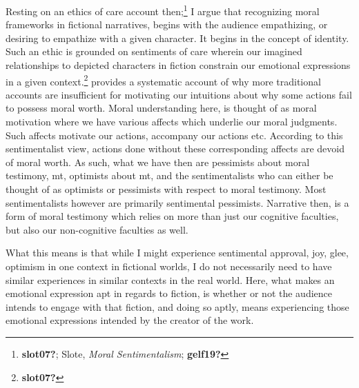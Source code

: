 \documentclass[phdthesis,12pt,final]{wuthesis}
\theoremstyle{definition}
\theoremstyle{definition}
\theoremstyle{definition}
\theoremstyle{definition}
\theoremstyle{remark}
\begin{document}
Resting on an ethics of care account then;\footnote{\textbf{slot07?}; Slote, \emph{Moral {Sentimentalism}}; \textbf{gelf19?}} I argue that recognizing moral frameworks in fictional narratives, begins with the audience empathizing, or desiring to empathize with a given character. It begins in the concept of identity. Such an ethic is grounded on sentiments of care wherein our imagined relationships to depicted characters in fiction constrain our emotional expressions in a given context.\footnote{\textbf{slot07?}} provides a systematic account of why more traditional accounts are insufficient for motivating our intuitions about why some actions fail to possess moral worth. Moral understanding here, is thought of as moral motivation where we have various affects which underlie our moral judgments. Such affects motivate our actions, accompany our actions etc. According to this sentimentalist view, actions done without these corresponding affects are devoid of moral worth. As such, what we have then are pessimists about moral testimony, mt, optimists about mt, and the sentimentalists who can either be thought of as optimists or pessimists with respect to moral testimony. Most sentimentalists however are primarily sentimental pessimists. Narrative then, is a form of moral testimony which relies on more than just our cognitive faculties, but also our non-cognitive faculties as well.

What this means is that while I might experience sentimental approval, joy, glee, optimism in one context in fictional worlds, I do not necessarily need to have similar experiences in similar contexts in the real world. Here, what makes an emotional expression apt in regards to fiction, is whether or not the audience intends to engage with that fiction, and doing so aptly, means experiencing those emotional expressions intended by the creator of the work.
\end{document}
